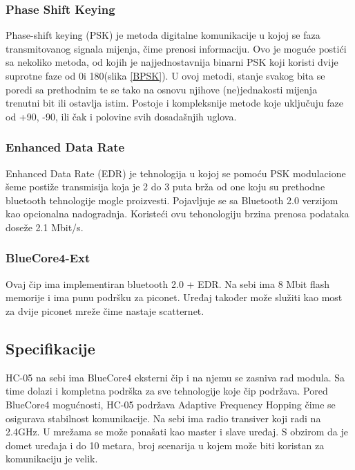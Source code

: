 \documentclass[../Document.tex]{subfiles}
\begin{document}
\subsubsection{Phase Shift Keying}
Phase-shift keying (PSK) je metoda digitalne komunikacije u kojoj se faza transmitovanog signala mijenja, čime prenosi informaciju. Ovo je moguće postići sa nekoliko metoda, od kojih je najjednostavnija binarni PSK koji koristi dvije suprotne faze od 0\textdegree i 180\textdegree (slika \ref{BPSK}). U ovoj metodi, stanje svakog bita se poredi sa prethodnim te se tako na osnovu njihove (ne)jednakosti mijenja trenutni bit ili ostavlja istim. Postoje i kompleksnije metode koje uključuju faze od +90\textdegree, -90\textdegree, ili čak i polovine svih dosadašnjih uglova.

\subsubsection{Enhanced Data Rate}
Enhanced Data Rate (EDR) je tehnologija u kojoj se pomoću PSK modulacione šeme postiže transmisija koja je 2 do 3 puta brža od one koju su prethodne bluetooth tehnologije mogle proizvesti. Pojavljuje se sa Bluetooth 2.0 verzijom kao opcionalna nadogradnja. Koristeći ovu tehonologiju brzina prenosa podataka doseže 2.1 Mbit/s.

\subsubsection{BlueCore4-Ext}
Ovaj čip ima implementiran bluetooth 2.0 + EDR. Na sebi ima 8 Mbit flash memorije i ima punu podršku za piconet. Uređaj također može služiti kao most za dvije piconet mreže čime nastaje scatternet.


\subsection{Specifikacije}
HC-05 na sebi ima BlueCore4 eksterni čip i na njemu se zasniva rad modula. Sa time dolazi i kompletna podrška za sve tehnologije koje čip podržava. Pored BlueCore4 mogućnosti, HC-05 podržava Adaptive Frequency Hopping čime se osigurava stabilnost komunikacije. Na sebi ima radio transiver koji radi na 2.4GHz. U mrežama se može ponašati kao master i slave uređaj. S obzirom da je domet uređaja i do 10 metara, broj scenarija u kojem može biti koristan za komunikaciju je velik.
\end{document}

